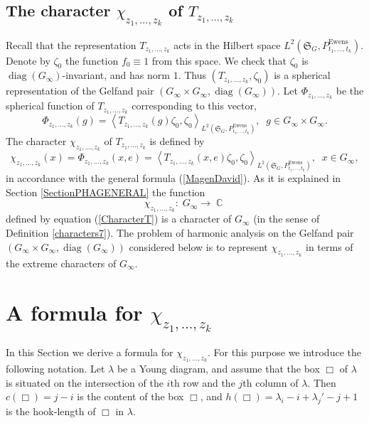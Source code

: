 \documentclass[12pt]{amsart}
\theoremstyle{definition}
\numberwithin{equation}{section}
\DeclareMathOperator{\C}{\mathbb{C}}
\DeclareMathOperator{\diag}{diag}
\DeclareMathOperator{\Ewens}{Ewens}
\begin{document}
\subsection{The character $\chi_{z_1,\ldots,z_k}$ of $T_{z_1,\ldots,z_k}$}
Recall that the representation $T_{z_1,\ldots,z_k}$ acts in the Hilbert space $L^2\left(\mathfrak{S}_{G},P_{t_1,\ldots,t_k}^{\Ewens}\right)$.
Denote by $\zeta_0$ the function $f_0\equiv 1$ from this space. We check that $\zeta_0$ is $\diag\left(G_{\infty}\right)$-invariant, and has norm $1$.
Thus $\left(T_{z_1,\ldots,z_k},\zeta_0\right)$ is a spherical representation of the Gelfand pair
$\left(G_{\infty}\times G_{\infty},\diag\left(G_{\infty}\right)\right)$.
Let $\Phi_{z_1,\ldots,z_k}$ be the spherical function of $T_{z_1,\ldots,z_k}$
corresponding to this vector,
\begin{equation}
\Phi_{z_1,\ldots,z_k}(g)=\left\langle T_{z_1,\ldots,z_k}(g)\zeta_0,\zeta_0\right\rangle_{L^2\left(\mathfrak{S}_{G},P_{t_1,\ldots,t_k}^{\Ewens}\right)},\;\; g\in G_{\infty}\times G_{\infty}.
\end{equation}
The character $\chi_{z_1,\ldots,z_k}$ of $T_{z_1,\ldots,z_k}$ is defined by
\begin{equation}\label{CharacterT}
\chi_{z_1,\ldots,z_k}(x)=\Phi_{z_1,\ldots,z_k}(x,e)=\left\langle T_{z_1,\ldots,z_k}(x,e)\zeta_0,\zeta_0\right\rangle_{L^2\left(\mathfrak{S}_{G},P_{t_1,\ldots,t_k}^{\Ewens}\right)},\;\; x\in G_{\infty},
\end{equation}
in accordance with the general formula (\ref{MagenDavid}).
As it is explained in Section \ref{SectionPHAGENERAL} the function
$$
\chi_{z_1,\ldots,z_k}:\; G_{\infty}\longrightarrow\C
$$
defined by equation (\ref{CharacterT}) is a character of $G_{\infty}$
(in the sense of Definition \ref{characters7}). The problem of harmonic analysis on the Gelfand pair $\left(G_{\infty}\times G_{\infty},\diag\left(G_{\infty}\right)\right)$
considered below is to represent $\chi_{z_1,\ldots,z_k}$ in terms of the extreme characters of
$G_{\infty}$.
\section{A formula for $\chi_{z_1,\ldots,z_k}$}
In this Section we derive  a formula for $\chi_{z_1,\ldots,z_k}$. For this purpose we introduce the following notation.
Let $\lambda$ be a Young diagram, and assume that the box $\Box$ of $\lambda$ is situated on the intersection of the $i$th row and the $j$th column of $\lambda$. Then $c(\Box)=j-i$ is the content of the box $\Box$, and
$h(\Box)=\lambda_i-i+\lambda_j'-j+1$ is the hook-length of $\Box$ in $\lambda$.
\end{document}
